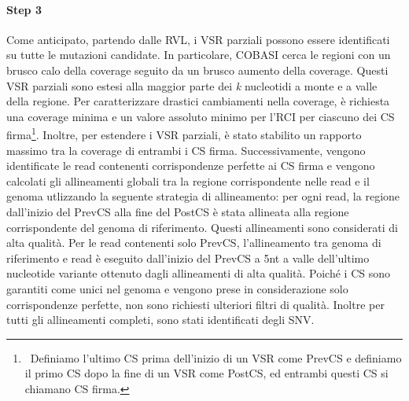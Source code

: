 \documentclass[../main.tex]{subfiles}
\begin{document}
\paragraph{Step 3} Come anticipato, partendo dalle RVL, i VSR parziali possono essere identificati su tutte le mutazioni candidate. In particolare, COBASI cerca le regioni con un brusco calo della coverage seguito da un brusco aumento della coverage. Questi VSR parziali sono estesi alla maggior parte dei \textit{k} nucleotidi a monte e a valle della regione. Per caratterizzare drastici cambiamenti nella coverage, è richiesta una coverage minima e un valore assoluto minimo per l'RCI per ciascuno dei CS firma\footnote{\ Definiamo l'ultimo CS prima dell'inizio di un VSR come PrevCS e definiamo il primo CS dopo la fine di un VSR come PostCS, ed entrambi questi CS si chiamano CS firma.}.  Inoltre, per estendere i VSR parziali, è stato stabilito un rapporto massimo tra la coverage di entrambi i CS firma. Successivamente, vengono identificate le read contenenti corrispondenze perfette ai CS firma e vengono calcolati gli allineamenti globali tra la regione corrispondente nelle read e il genoma utlizzando la seguente strategia di allineamento: per ogni read, la regione dall'inizio del PrevCS alla fine del PostCS è stata allineata alla regione corrispondente del genoma di riferimento. Questi allineamenti sono considerati di alta qualità. Per le read contenenti solo PrevCS, l'allineamento tra genoma di riferimento e read è eseguito dall'inizio del PrevCS a 5nt a valle dell'ultimo nucleotide variante ottenuto dagli allineamenti di alta qualità. Poiché i CS sono garantiti come unici nel genoma e vengono prese in considerazione solo corrispondenze perfette, non sono richiesti ulteriori filtri di qualità. Inoltre per tutti gli allineamenti completi, sono stati identificati degli SNV.
\end{document}
